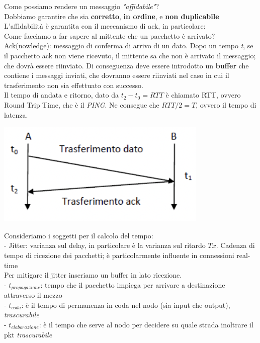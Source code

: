 \documentclass[11pt, oneside]{article}   	%
\begin{document}
Come possiamo rendere un messaggio \emph{"affidabile"}?\\
Dobbiamo garantire che sia \textbf{corretto}, \textbf{in ordine}, e \textbf{non duplicabile}\\
L'affidabilità è garantita con il meccanismo di ack, in particolare:\\
Come facciamo a far sapere al mittente che un pacchetto è arrivato?\\
Ack(nowledge): messaggio di conferma di arrivo di un dato. Dopo un tempo \emph{t}, se il pacchetto ack non viene ricevuto, il mittente sa che non è arrivato il messaggio; che dovrà essere riinviato. Di conseguenza deve essere introdotto un \textbf{buffer} che contiene i messaggi inviati, che dovranno essere riinviati nel caso in cui il trasferimento non sia effettuato con successo.\\
Il tempo di andata e ritorno, dato da \(t_2 - t_0 = RTT\) è chiamato RTT, ovvero Round Trip Time, che è il \emph{PING}. Ne consegue che \(RTT/2 = T\), ovvero il tempo di latenza.	
\begin{center}
\includegraphics[scale=0.6]{ack}
\end{center}
Consideriamo i soggetti per il calcolo del tempo:\\
- Jitter: varianza sul delay, in particolare è la varianza sul ritardo \(Tx\). Cadenza di tempo di ricezione dei pacchetti; è particolarmente influente in connessioni real-time\\Per mitigare il jitter inseriamo un buffer in lato ricezione.\\
- \(t_{propagazione} \): tempo che il pacchetto impiega per arrivare a destinazione attraverso il mezzo\\
- \(t_{coda} \): è il tempo di permanenza in coda nel nodo (sia input che output), \emph{trascurabile}\\
- \(t_{elaborazione} \): è il tempo che serve al nodo per decidere su quale strada inoltrare il pkt \emph{trascurabile}\\
\end{document}
